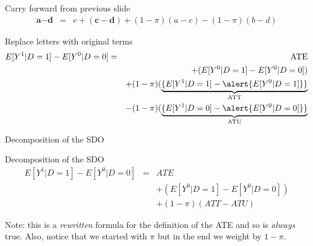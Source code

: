 \documentclass{beamer}
\begin{document}
\begin{frame}[shrink=20,plain]
  \begin{block}{Carry forward from previous slide}
    \begin{eqnarray*}
      \textbf{a}-\textbf{d}&=&e  + (\textbf{c} - \textbf{d}) + (1-\pi)(a-c) -(1-\pi)(b-d)
    \end{eqnarray*}
  \end{block}

  \begin{block}{Replace letters with original terms }
    \begin{eqnarray*}
      E[Y^1|D=1] - E[Y^0|D=0] &=& \text{ATE}  \\
      &&+ (E[Y^0|D=1] - E[Y^0|D=0])  \\
      && + (1-\pi)( \underbrace{\{E[Y^1|D=1] - \alert{E[Y^0|D=1]}\}}_{ \mathclap{\text{ATT}}}  \\
      && - (1-\pi)( \underbrace{\{E[Y^1|D=0] - \alert{E[Y^0|D=0]}\}}_{ \mathclap{\text{ATU}}}  \\
    \end{eqnarray*}
  \end{block}
\end{frame}

\begin{frame}{Decomposition of the SDO}

  \begin{block}{Decomposition of the SDO}
    \begin{eqnarray*}
      E[Y^1 | D=1] - E[Y^0 | D=0]  &=& ATE \\
      &&+ (E[Y^0|D=1] - E[Y^0|D=0])  \\
      && + (1-\pi)(ATT - ATU)
    \end{eqnarray*}
  \end{block}
  
  \bigskip
  
  Note: this is a \emph{rewritten} formula for the definition of the ATE and so is \emph{always} true.  Also, notice that we started with $\pi$ but in the end we weight by $1-\pi$.
\end{frame}
\end{document}
